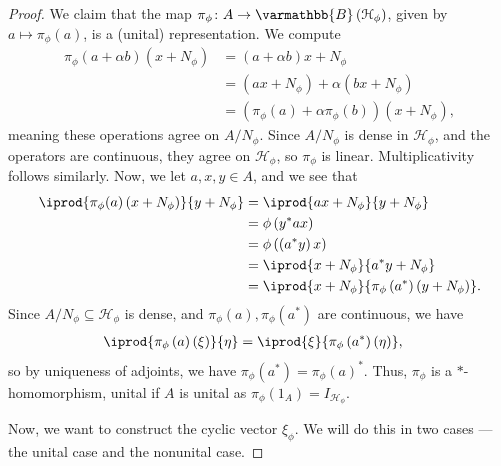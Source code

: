 \documentclass[10pt]{mypackage}
\renewcommand*{\mathbb}[1]{\varmathbb{#1}}
\newcommand{\B}{\mathbb{B}}
\begin{document}
\begin{proof}
  We claim that the map $\pi_{\phi}\colon A\rightarrow \B\left(\mathcal{H}_{\phi}\right)$, given by $a\mapsto \pi_{\phi}(a)$, is a (unital) representation. We compute
  \begin{align*}
    \pi_{\phi}\left(a + \alpha b\right)\left(x + N_{\phi}\right) &= \left(a + \alpha b\right)x + N_{\phi}\\
                                                                 &= \left(ax + N_{\phi}\right) + \alpha\left(bx + N_{\phi}\right)\\
                                                                 &= \left(\pi_{\phi}\left(a\right)+ \alpha \pi_{\phi}\left(b\right)\right)\left(x + N_{\phi}\right),
  \end{align*}
  meaning these operations agree on $A/N_{\phi}$. Since $A/N_{\phi}$ is dense in $\mathcal{H}_{\phi}$, and the operators are continuous, they agree on $\mathcal{H}_{\phi}$, so $\pi_{\phi}$ is linear. Multiplicativity follows similarly. Now, we let $a,x,y\in A$, and we see that
  \begin{align*}
    \iprod{\pi_{\phi}(a)\left(x + N_{\phi}\right)}{y + N_{\phi}} &= \iprod{ax + N_{\phi}}{y + N_{\phi}}\\
                                                         &= \phi\left(y^{\ast}ax\right)\\
                                                         &= \phi\left(\left(a^{\ast}y\right)x\right)\\
                                                         &= \iprod{x + N_{\phi}}{a^{\ast}y + N_{\phi}}\\
                                                       &= \iprod{x + N_{\phi}}{\pi_{\phi}\left(a^{\ast}\right)\left(y + N_{\phi}\right)}.
  \end{align*}
  Since $A/N_{\phi}\subseteq \mathcal{H}_{\phi}$ is dense, and $\pi_{\phi}(a),\pi_{\phi}\left(a^{\ast}\right)$ are continuous, we have
  \begin{align*}
    \iprod{\pi_{\phi}\left(a\right)\left(\xi\right)}{\eta} &= \iprod{\xi}{\pi_{\phi}\left(a^{\ast}\right)\left(\eta\right)},
  \end{align*}
  so by uniqueness of adjoints, we have $\pi_{\phi}\left(a^{\ast}\right) = \pi_{\phi}\left(a\right)^{\ast}$. Thus, $\pi_{\phi}$ is a $\ast$-homomorphism, unital if $A$ is unital as $\pi_{\phi}\left(1_A\right) = I_{\mathcal{H}_{\phi}}$.\newline

  Now, we want to construct the cyclic vector $\xi_{\phi}$. We will do this in two cases --- the unital case and the nonunital case.\newline


\end{proof}
\end{document}
